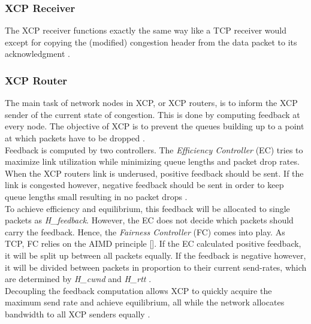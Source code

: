 \documentclass[a4paper,conference]{IEEEtran}
\begin{document}
\subsubsection*{XCP Receiver}
The XCP receiver functions exactly the same way like a TCP receiver would except for copying the (modified) congestion header from the data packet to its acknowledgment \cite{katabi2002congestion}.

\subsubsection*{XCP Router}
The main task of network nodes in XCP, or XCP routers, is to inform the XCP sender of the current state of congestion. This is done by computing feedback at every node. The objective of XCP is to prevent the queues building up to a point at which packets have to be dropped \cite{katabi2002congestion}.\\
Feedback is computed by two controllers. The \textit{Efficiency Controller} (EC) tries to maximize link utilization while minimizing queue lengths and packet drop rates. When the XCP routers link is underused, positive feedback should be sent. If the link is congested however, negative feedback should be sent in order to keep queue lengths small resulting in no packet drops \cite{katabi2002congestion,1498331}.\\
To achieve efficiency and equilibrium, this feedback will be allocated to single packets as \textit{H\_feedback}. However, the EC does not decide which packets should carry the feedback. Hence, the \textit{Fairness Controller} (FC) comes into play. As TCP, FC relies on the AIMD principle []. If the EC calculated positive feedback, it will be split up between all packets equally. If the feedback is negative however, it will be divided between packets in proportion to their current send-rates, which are determined by \textit{H\_cwnd} and \textit{H\_rtt} \cite{katabi2002congestion,1498331}.\\
Decoupling the feedback computation allows XCP to quickly acquire the maximum send rate and achieve equilibrium, all while the network allocates bandwidth to all XCP senders equally \cite{katabi2002congestion}.
\end{document}
